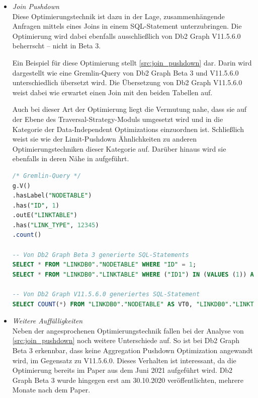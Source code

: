 \begin{itemize}
    Durch den Einsatz der Optimierungstechnik kann es somit vermieden werden, den gesamten Inhalt einer oder mehrerer Vertex- beziehungsweise Edge-Tabellen abzufragen, wenn eigentlich nur 100 Einträge wie in \autoref{src:nachweis_limit_pushdown} benötigt werden. Daher dürfte diese Optimierung einen erheblichen Einfluss auf die Performance von Db2 Graph haben, besonders bei großen Tabellen.

    \item \textit{Join Pushdown}\\
    Diese Optimierungstechnik ist dazu in der Lage, zusammenhängende Anfragen mittels eines Joins in einem SQL-Statement unterzubringen. Die Optimierung wird dabei ebenfalls ausschließlich von Db2 Graph V11.5.6.0 beherrscht -- nicht in Beta 3.

    Ein Beispiel für diese Optimierung stellt \autoref{src:join_pushdown} dar. Darin wird dargestellt wie eine Gremlin-Query von Db2 Graph Beta 3 und V11.5.6.0 unterschiedlich übersetzt wird. Die Übersetzung von Db2 Graph V11.5.6.0 weist dabei wie erwartet einen Join mit den beiden Tabellen auf.

    Auch bei dieser Art der Optimierung liegt die Vermutung nahe, dass sie auf der Ebene des Traversal-Strategy-Moduls umgesetzt wird und in die Kategorie der Data-Independent Optimizations einzuordnen ist. Schließlich weist sie wie der Limit-Pushdown Ähnlichkeiten zu anderen Optimierungstechniken dieser Kategorie auf. Darüber hinaus wird sie ebenfalls in deren Nähe in \cite{ibm_docs_optimize} aufgeführt.

\begin{lstlisting}[label=src:join_pushdown,caption={Beispiel Join Pushdown},language=SQL]
/* Gremlin-Query */
g.V()
.hasLabel("NODETABLE")
.has("ID", 1)
.outE("LINKTABLE")
.has("LINK_TYPE", 12345)
.count()

-- Von Db2 Graph Beta 3 generierte SQL-Statements
SELECT * FROM "LINKDB0"."NODETABLE" WHERE "ID" = 1;
SELECT * FROM "LINKDB0"."LINKTABLE" WHERE ("ID1") IN (VALUES (1)) AND "LINK_TYPE" = 12345;

-- Von Db2 Graph V11.5.6.0 generiertes SQL-Statement
SELECT COUNT(*) FROM "LINKDB0"."NODETABLE" AS VT0, "LINKDB0"."LINKTABLE" AS ET1 WHERE VT0."ID" = 1 AND ET1."LINK_TYPE" = 12345 AND VT0.ID = ET1.ID1
\end{lstlisting}

    \item \textit{Weitere Auffälligkeiten}\\
    Neben der angesprochenen Optimierungstechnik fallen bei der Analyse von \autoref{src:join_pushdown} noch weitere Unterschiede auf. So ist bei Db2 Graph Beta 3 erkennbar, dass keine Aggregation Pushdown Optimization angewandt wird, im Gegensatz zu V11.5.6.0. Dieses Verhalten ist interessant, da die Optimierung bereits im Paper \cite{sigmod_tian} aus dem Juni 2021 aufgeführt wird. Db2 Graph Beta 3 wurde hingegen erst am 30.10.2020 veröffentlichten, mehrere Monate nach dem Paper. 


\end{itemize}
